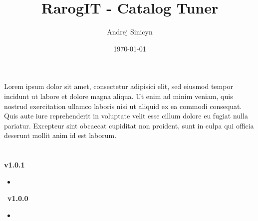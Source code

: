 \date{\today}
\author{Andrej Sinicyn}
\title{RarogIT - Catalog Tuner}
\def\pdfsubject{Catalog Tuner for Magento}
\def\pdfkeywords{Catalog Tuner;Magento}
\def\logopath{../media/logo/rarog-it-logo.png}
\def\bigtitleimage{../media/box/cataolg-tuner-box.png}



\chapter{
         }
Lorem ipsum dolor sit amet, consectetur adipisici elit, sed eiusmod tempor incidunt ut labore et dolore magna aliqua. Ut enim ad minim veniam, quis nostrud exercitation ullamco laboris nisi ut aliquid ex ea commodi consequat. Quis aute iure reprehenderit in voluptate velit esse cillum dolore eu fugiat nulla pariatur. Excepteur sint obcaecat cupiditat non proident, sunt in culpa qui officia deserunt mollit anim id est laborum.\\
\chapter{
         }
\textbf{v1.0.1}
\begin{itemize}
\item
{}
\end{itemize}\
\textbf{v1.0.0}
\begin{itemize}
\item
{}
\end{itemize}

